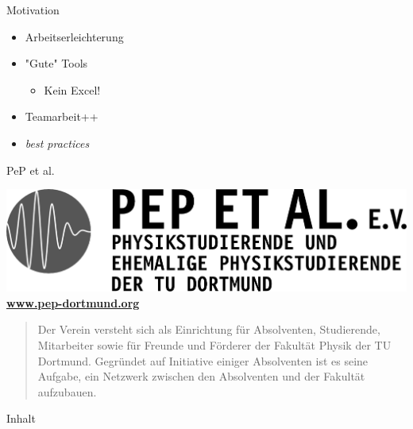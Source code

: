 {
  \begin{frame}
    \titlepage
  \end{frame}
}

\begin{frame}{Motivation}
  \begin{itemize}
    \item Arbeitserleichterung
    \item "Gute" Tools \begin{itemize}
      \item Kein Excel!
    \end{itemize}
  \item Teamarbeit++
  \item \textit{best practices}
  \end{itemize}  
\end{frame}

\begin{frame}{PeP et al.}
  \begin{center}
    \includegraphics[width=.5\paperwidth]{img/peplogox.png} \\
    \color{TUgreen}\textbf{\href{http://pep-dortmund.org}{www.pep-dortmund.org}}
  \end{center}
  \begin{quote}
    \begin{spacing}{1.0}
      Der Verein versteht sich als Einrichtung für Absolventen, Studierende, Mitarbeiter sowie für Freunde und Förderer der Fakultät Physik der TU Dortmund. Gegründet auf Initiative einiger Absolventen ist es seine Aufgabe, ein Netzwerk zwischen den Absolventen und der Fakultät aufzubauen.
    \end{spacing}
  \end{quote}
\end{frame}

\begin{frame}{Inhalt}
  \tableofcontents[subsectionstyle=hide]
\end{frame}

